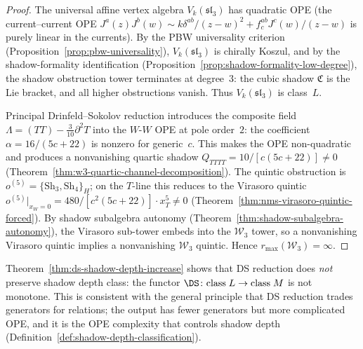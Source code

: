 \begin{proof}
The universal affine vertex algebra $V_k(\mathfrak{sl}_3)$ has
quadratic OPE (the current--current OPE
$J^a(z)J^b(w) \sim k\delta^{ab}/(z-w)^2 + f^{ab}_c J^c(w)/(z-w)$
is purely linear in the currents). By the PBW universality criterion
(Proposition~\ref{prop:pbw-universality}), $V_k(\mathfrak{sl}_3)$ is
chirally Koszul, and by the shadow-formality identification
(Proposition~\ref{prop:shadow-formality-low-degree}), the shadow obstruction tower
terminates at degree~$3$: the cubic shadow $\mathfrak{C}$ is the Lie
bracket, and all higher obstructions vanish. Thus
$V_k(\mathfrak{sl}_3)$ is class~$L$.

Principal Drinfeld--Sokolov reduction introduces the composite field
$\Lambda = (TT) - \tfrac{3}{10}\partial^2 T$ into the $W$-$W$ OPE at
pole order~$2$: the coefficient $\alpha = 16/(5c+22)$ is nonzero for
generic~$c$. This makes the OPE non-quadratic and produces a
nonvanishing quartic shadow
$Q_{TTTT} = 10/[c(5c+22)] \neq 0$
(Theorem~\ref{thm:w3-quartic-channel-decomposition}).
The quintic obstruction is
$o^{(5)} = \{\mathrm{Sh}_3, \mathrm{Sh}_4\}_H$; on the $T$-line this
reduces to the Virasoro quintic
$o^{(5)}|_{x_W=0} = 480/[c^2(5c+22)] \cdot x_T^5 \neq 0$
(Theorem~\ref{thm:nms-virasoro-quintic-forced}).
By shadow subalgebra autonomy
(Theorem~\ref{thm:shadow-subalgebra-autonomy}),
the Virasoro sub-tower embeds into the $\mathcal{W}_3$ tower, so a
nonvanishing Virasoro quintic implies a nonvanishing
$\mathcal{W}_3$ quintic. Hence $r_{\max}(\mathcal{W}_3) = \infty$.
\end{proof}

\begin{remark}\label{rem:ds-depth-monotonicity-failure}
Theorem~\ref{thm:ds-shadow-depth-increase} shows that DS reduction
does \emph{not} preserve shadow depth class: the functor
$\DS \colon \mathrm{class}\;L \to \mathrm{class}\;M$ is not
monotone. This is consistent with the general principle that DS
reduction trades generators for relations; the output has fewer
generators but more complicated OPE, and it is the OPE complexity
that controls shadow depth
(Definition~\ref{def:shadow-depth-classification}).
\end{remark}

